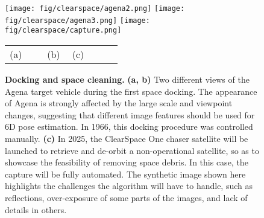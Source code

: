 
\begin{figure}[t]
\centering
\texttt{[image: fig/clearspace/agena2.png]}
\texttt{[image: fig/clearspace/agena3.png]}
\texttt{[image: fig/clearspace/capture.png]}
\begin{small}
\begin{tabular}{C{0.3\linewidth}C{0.2\linewidth}C{0.4\linewidth}}
(a)&(b)&(c)
\end{tabular}
\end{small}
\vspace{-6mm}
\caption{\small {\bf Docking and space cleaning.} {\bf (a, b)} Two different views of the Agena target vehicle during the first space docking. The appearance of Agena is strongly affected by the large scale and viewpoint changes, suggesting that different image features should be used for 6D pose estimation. In 1966, this docking procedure was controlled manually. {\bf (c)} In 2025, the ClearSpace One chaser satellite will be launched to retrieve and de-orbit a non-operational satellite, so as to showcase the feasibility of removing space debris. In this case, the capture will be fully automated. The synthetic image shown here highlights the challenges the algorithm will have to handle, such as reflections, over-exposure of some parts of the images, and lack of details in others. 
}
\label{fig:docking}
\end{figure}